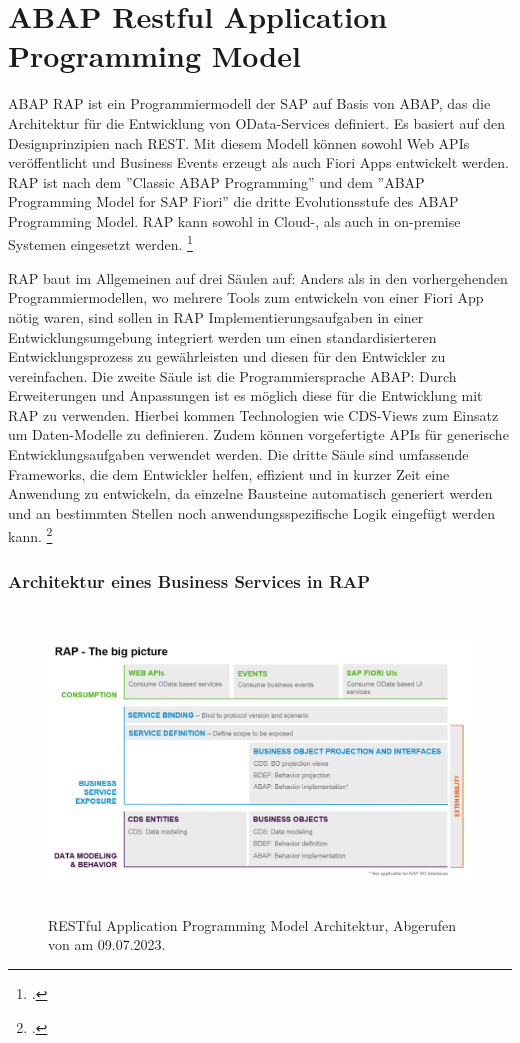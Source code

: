 \section{ABAP Restful Application Programming Model}

ABAP RAP ist ein Programmiermodell der SAP auf Basis von ABAP, das die Architektur für die Entwicklung von OData-Services definiert. Es basiert auf den Designprinzipien nach REST. Mit diesem Modell können sowohl Web APIs veröffentlicht und Business Events erzeugt als auch Fiori Apps entwickelt werden. RAP ist nach dem ''Classic ABAP Programming'' und dem ''ABAP Programming Model for SAP Fiori'' die dritte Evolutionsstufe des ABAP Programming Model. RAP kann sowohl in Cloud-, als auch in on-premise Systemen eingesetzt werden. \footcite[Vgl.][]{sap_rap_2023}

RAP baut im Allgemeinen auf drei Säulen auf: Anders als in den vorhergehenden Programmiermodellen, wo mehrere Tools zum entwickeln von \zB einer Fiori App nötig waren, sind sollen in RAP Implementierungsaufgaben in einer Entwicklungsumgebung integriert werden um einen standardisierteren Entwicklungsprozess zu gewährleisten und diesen für den Entwickler zu vereinfachen. Die zweite Säule ist die Programmiersprache ABAP: Durch Erweiterungen und Anpassungen ist es möglich diese für die Entwicklung mit RAP zu verwenden. Hierbei kommen Technologien wie CDS-Views zum Einsatz um Daten-Modelle zu definieren. Zudem können vorgefertigte APIs für generische Entwicklungsaufgaben verwendet werden. Die dritte Säule sind umfassende Frameworks, die dem Entwickler helfen, effizient und in kurzer Zeit eine Anwendung zu entwickeln, da einzelne Bausteine automatisch generiert werden und an bestimmten Stellen noch anwendungsspezifische Logik eingefügt werden kann. \footcite[Vgl.][]{sap_rap_2023}

\subsubsection{Architektur eines Business Services in RAP}

\begin{figure}[h]
    \centering
    \includegraphics[height=8cm]{Bilder/RAP_Architektur.png}
    \caption[RESTful Application Programming Model Architektur]{RESTful Application Programming Model Architektur, Abgerufen von \cite{sap_rap_2023} am 09.07.2023.}
    \label{fig:iso_norm}
\end{figure}

